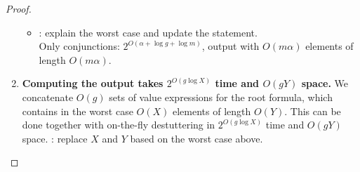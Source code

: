 \begin{proof}
\begin{enumerate}
\begin{itemize}
			\item
			\TODO: explain the worst case and update the statement.\\
			Only conjunctions: $2^{O(\alpha + \log g + \log m)}$, output with $O(m \alpha)$ elements of length $O(m \alpha)$.\\
		\end{itemize}

		\item
		\textbf{Computing the output takes $2^{O(g \log X)}$ time and $O(g Y)$ space.}
		We concatenate $O(g)$ sets of value expressions for the root formula, which contains in the worst case $O(X)$ elements of length $O(Y)$.
		This can be done together with on-the-fly destuttering in $2^{O(g \log X)}$ time and $O(g Y)$ space.
		\TODO: replace $X$ and $Y$ based on the worst case above.

	\end{enumerate}
	
%	
%	
	
%	
%	
%	
%	
%	
\end{proof}